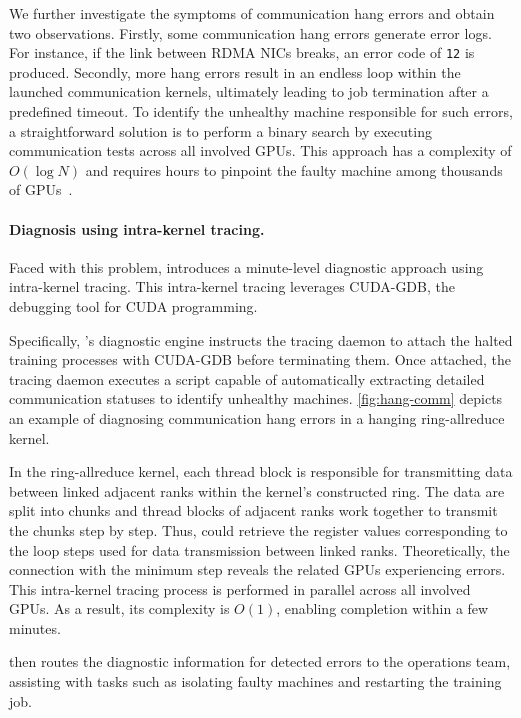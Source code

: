 We further investigate the symptoms of communication hang errors and obtain two observations. Firstly, some communication hang errors generate error logs. For instance, if the link between RDMA NICs breaks, an error code of \texttt{12} is produced. Secondly, more hang errors result in an endless loop within the launched communication kernels, ultimately leading to job termination after a predefined timeout. To identify the unhealthy machine responsible for such errors, a straightforward solution is to perform a binary search by executing communication tests across all involved GPUs. This approach has a complexity of $O(\log N)$ and requires hours to pinpoint the faulty machine among thousands of GPUs~\cite{wuFALCONPinpointing}.

\paragraph{Diagnosis using intra-kernel tracing.}
Faced with this problem, \sysname{} introduces a minute-level diagnostic approach using intra-kernel tracing. This intra-kernel tracing leverages CUDA-GDB, the debugging tool for CUDA programming.

Specifically, \sysname{}'s diagnostic engine instructs the tracing daemon to attach the halted training processes with CUDA-GDB before terminating them.
Once attached, the tracing daemon executes a script capable of automatically extracting detailed communication statuses to identify unhealthy machines.
\autoref{fig:hang-comm} depicts an example of diagnosing communication hang errors in a hanging ring-allreduce kernel.

In the ring-allreduce kernel, each thread block is responsible for transmitting data between linked adjacent ranks within the kernel’s constructed ring.
The data are split into chunks and thread blocks of adjacent ranks work together to transmit the chunks step by step.
Thus, \sysname{} could retrieve the register values corresponding to the loop steps used for data transmission between linked ranks. 
Theoretically, the connection with the minimum step reveals the related GPUs experiencing errors.
This intra-kernel tracing process is performed in parallel across all involved GPUs.
As a result, its complexity is $O(1)$, enabling completion within a few minutes.

\sysname{} then routes the diagnostic information for detected errors to the operations team, assisting with tasks such as isolating faulty machines and restarting the training job.

